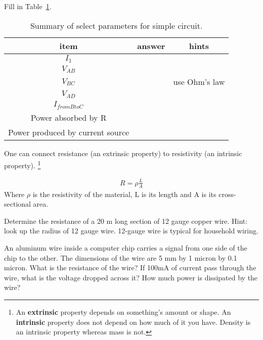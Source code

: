 \begin{blevel}
Fill in Table~\ref{T:21}.
\end{blevel}

\begin{table}[H]
\begin{center}
\begin{tabular}{|c|c|c|}\hline
item&answer&hints\\ \hline
$I_1$	&	&	\\ \hline
$V_{AB}$	&	&	\\ \hline
$V_{BC}$	&	& use Ohm's law	\\ \hline
$V_{AD}$	&	&	\\ \hline
$I_{from B to C}$	&	&	\\ \hline
Power absorbed by R	&	&	\\ \hline
Power produced by current source	&	&	\\ \hline
\end{tabular}
\label{T:21}
\caption{Summary of select parameters for simple circuit.}
\end{center}
\end{table}

One can connect resistance (an extrinsic property) to resistivity (an intrinsic property). \footnote{An \textbf{extrinsic} property depends on something's amount or shape. An \textbf{intrinsic} property does not depend on how much of it you have. Density is an intrinsic property whereas mass is not.}\par

\begin{align}
R = \rho \frac{L}{A} \label{E:2rho}
\end{align}
Where $\rho$ is the resistivity of the material, L is its length and A is its cross-sectional area.

\begin{blevel}
Determine the resistance of a 20 m long section of 12 gauge copper wire. Hint: look up the radius of 12 gauge wire. 12-gauge wire is typical for household wiring.
\end{blevel}

\begin{blevel}
An aluminum wire inside a computer chip carries a signal from one side of the chip to the other. The dimensions of the wire are 5 mm by 1 micron by 0.1 micron. What is the resistance of the wire? If 100mA of current pass through the wire, what is the voltage dropped across it? How much power is dissipated by the wire? 
\end{blevel}

